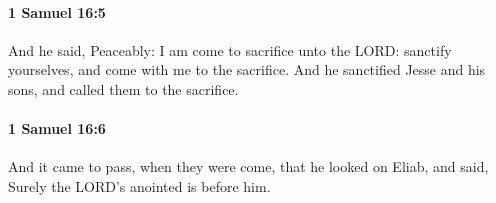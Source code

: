 		\paragraph{1 Samuel 16:5} %
			\label{1SAMUEL-16-5}

			And he said, Peaceably: I am come to sacrifice unto the LORD: sanctify yourselves, and come with me to the sacrifice. And he sanctified Jesse and his sons, and called them to the sacrifice.


		\paragraph{1 Samuel 16:6} %
			\label{1SAMUEL-16-6}

			And it came to pass, when they were come, that he looked on Eliab, and said, Surely the LORD’s anointed is before him.


